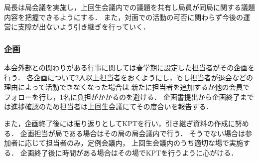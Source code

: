 局長は局会議を実施し，上回生会議内での議題を共有し局員が同局に関する議題内容を把握できるようにする．
また，対面での活動の可否に関わらず今後の運営に支障が出ないよう引き継ぎを行っていく．

\subsubsection*{企画}
本会外部との関わりがある行事に関しては春学期に設定した担当者がその企画を行う．
各企画について2人以上担当者をおくようにし，もし担当者が退会などの理由によって活動できなくなった場合は
新たに担当者を追加するか他の会員でフォローを行し，1名に負担がかかるのを避ける．
企画書提出から企画終了までは進捗確認のため担当者は上回生会議にてその度合いを報告する．

また，企画終了後には振り返りとしてKPTを行い，引き継ぎ資料の作成に努める．
企画担当が局である場合はその局の局会議内で行う．
そうでない場合は参加者に応じて担当者のみ，定例会議内，
上回生会議内のうち適切な場で実施する．
企画終了後に時間がある場合はその場でKPTを行うように心がける．

